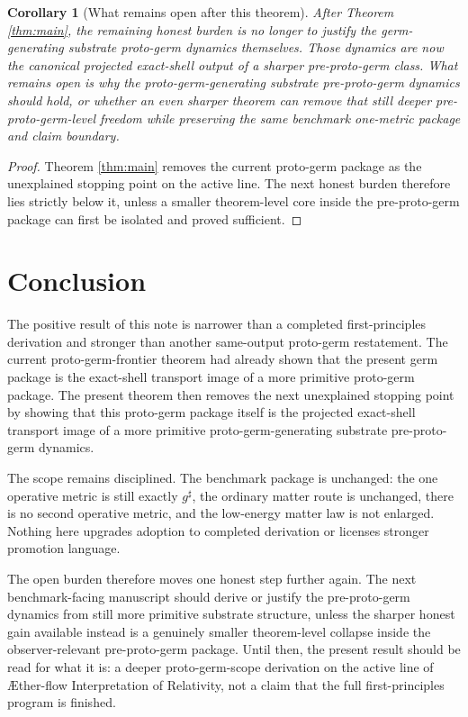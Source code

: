 \documentclass[11pt]{article}
\newcommand{\Aflow}{\AE{}ther-flow}
\newcommand{\TheoryName}{\Aflow{} Interpretation of Relativity}
\newcommand{\CompletedMetric}{g^{\sharp}}
\newtheorem{corollary}{Corollary}
\begin{document}
\begin{corollary}[What remains open after this theorem]
\label{cor:next}
After Theorem \ref{thm:main}, the remaining honest burden is no longer to justify the germ-generating substrate proto-germ dynamics themselves. Those dynamics are now the canonical projected exact-shell output of a sharper pre-proto-germ class. What remains open is why the proto-germ-generating substrate pre-proto-germ dynamics should hold, or whether an even sharper theorem can remove that still deeper pre-proto-germ-level freedom while preserving the same benchmark one-metric package and claim boundary.
\end{corollary}

\begin{proof}
Theorem \ref{thm:main} removes the current proto-germ package as the unexplained stopping point on the active line. The next honest burden therefore lies strictly below it, unless a smaller theorem-level core inside the pre-proto-germ package can first be isolated and proved sufficient.
\end{proof}

\section{Conclusion}

The positive result of this note is narrower than a completed first-principles derivation and stronger than another same-output proto-germ restatement. The current proto-germ-frontier theorem had already shown that the present germ package is the exact-shell transport image of a more primitive proto-germ package. The present theorem then removes the next unexplained stopping point by showing that this proto-germ package itself is the projected exact-shell transport image of a more primitive proto-germ-generating substrate pre-proto-germ dynamics.

The scope remains disciplined. The benchmark package is unchanged: the one operative metric is still exactly \(\CompletedMetric\), the ordinary matter route is unchanged, there is no second operative metric, and the low-energy matter law is not enlarged. Nothing here upgrades adoption to completed derivation or licenses stronger promotion language.

The open burden therefore moves one honest step further again. The next benchmark-facing manuscript should derive or justify the pre-proto-germ dynamics from still more primitive substrate structure, unless the sharper honest gain available instead is a genuinely smaller theorem-level collapse inside the observer-relevant pre-proto-germ package. Until then, the present result should be read for what it is: a deeper proto-germ-scope derivation on the active line of \TheoryName{}, not a claim that the full first-principles program is finished.
\end{document}
